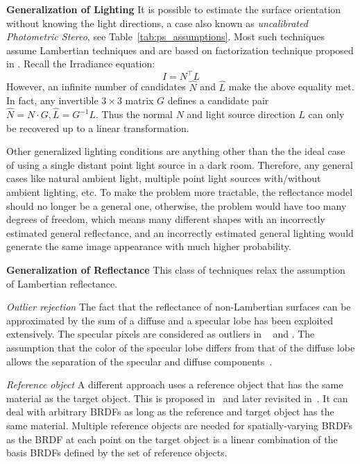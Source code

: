 \textbf{Generalization of Lighting} It is possible to estimate the surface orientation without knowing the light directions, a case also known as \textit{uncalibrated Photometric Stereo}, see Table~\ref{tab:ps_assumptions}. Most such techniques assume Lambertian techniques and are based on factorization technique proposed in \cite{hayakawa1994photometric}. Recall the Irradiance equation:
$$
I=N^\top L
$$
However, an infinite number of candidates $\hat{N}$ and $\hat{L}$ make the above equality met. In fact, any invertible $3\times 3$ matrix $G$ defines a candidate pair $\hat{N} = N\cdot G, \hat{L}=G^{-1}L$. Thus the normal $N$ and light source direction $L$ can only be recovered up to a linear transformation.

Other generalized lighting conditions are anything other than the the ideal case of using a single distant point light source in a dark room. Therefore, any general cases like natural ambient light, multiple point light sources with/without ambient lighting, etc. To make the problem more tractable, the reflectance model should no longer be a general one, otherwise, the problem would have too many degrees of freedom, which means many different shapes with an incorrectly estimated general reflectance, and an incorrectly estimated general lighting would generate the same image appearance with much higher probability.

\textbf{Generalization of Reflectance} This class of techniques relax the assumption of Lambertian reflectance.

\textit{Outlier rejection} 
The fact that the reflectance of non-Lambertian surfaces can be approximated by the sum of a diffuse and a specular lobe has been exploited extensively. The specular pixels are considered as outliers in ~\cite{coleman1982obtaining} and \cite{barsky20034}. The assumption that the color of the specular lobe differs from that of the diffuse lobe allows the separation of the specular and diffuse components~\cite{mallick2005beyond,sato1994temporal,schluns1993photometric}.

\textit{Reference object}
A different approach uses a reference object that has the same material as the target object. This is proposed in~\cite{silver1980determining} and later revisited in~\cite{hertzmann2005example}. It can deal with arbitrary BRDFs as long as the reference and target object has the same material. Multiple reference objects are needed for spatially-varying BRDFs as the BRDF at each point on the target object is a linear combination of the basis BRDFs defined by the set of reference objects. 

